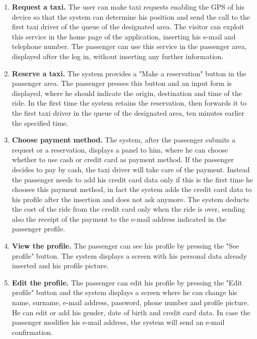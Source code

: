 \documentclass[18pt,oneside,a4paper, titlepage]{article}
\begin{document}
\begin{enumerate}
			\item \textbf{Request a taxi.}
				The user can make taxi requests enabling the GPS of his device so that the system can determine his position and send the call to the first taxi driver of the queue of the designated area.
				The visitor can exploit this service in the home page of the application, inserting his e-mail and telephone number.
				The passenger can use this service in the passenger area, displayed after the log in, without inserting any further information.
				
			\item \textbf{Reserve a taxi.}
				The system provides a "Make a reservation" button in the passenger area. The passenger presses this button and an input form is displayed, where he should indicate the origin, destination and time of the ride.
				In the first time the system retains the reservation, then forwards it to the first taxi driver in the queue of the designated area, ten minutes earlier the specified time.
				
			\item \textbf{Choose payment method.}
				The system, after the passenger submits a request or a reservation, displays a panel to him, where he can choose whether to use cash or credit card as payment method. If the passenger decides to pay by cash, the taxi driver will take care of the payment. Instead the passenger needs to add his credit card data only if this is the first time he chooses this payment method, in fact the system adds the credit card data to his profile after the insertion and does not ask anymore. The system deducts the cost of the ride from the credit card only when the ride is over, sending also the receipt of the payment to the e-mail address indicated in the passenger profile.
				
			\item \textbf{View the profile.}
				The passenger can see his profile by pressing the "See profile" button. The system displays a screen with his personal data already inserted and his profile picture.
				
			\item \textbf{Edit the profile.}
				 The passenger can edit his profile by pressing the "Edit profile" button and the system displays a screen where he can change his name, surname, e-mail address, password, phone number and profile picture. He can edit or add his gender, date of birth and credit card data. In case the passenger modifies his e-mail address, the system will send an e-mail confirmation.
				 

\end{enumerate}
\end{document}
